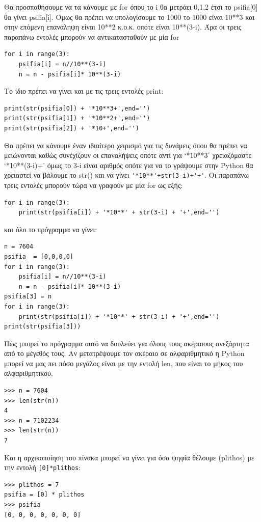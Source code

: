 \documentclass[b5paper,11pt,twoside,openleft]{memoir}
\begin{document}
Θα προσπαθήσουμε να τα κάνουμε με for όπου το i θα μετράει 0,1,2 έτσι το psifia[0] θα γίνει psifia[i]. Όμως θα πρέπει να υπολογίσουμε το 1000 το 1000 είναι 10**3 και στην επόμενη επανάληψη είναι 10**2 κ.ο.κ. οπότε είναι 10**(3-i).
Άρα οι τρεις παραπάνω εντολές μπορούν να αντικατασταθούν με μία for
\begin{lstlisting}
for i in range(3):
    psifia[i] = n//10**(3-i)
    n = n - psifia[i]* 10**(3-i)
\end{lstlisting}

Το ίδιο πρέπει να γίνει και με τις τρεις εντολές print:
\begin{lstlisting}
print(str(psifia[0]) + '*10**3+',end='')
print(str(psifia[1]) + '*10**2+',end='')
print(str(psifia[2]) + '*10+',end='')
\end{lstlisting}
Θα πρέπει να κάνουμε έναν ιδιαίτερο χειρισμό για τις δυνάμεις όπου θα πρέπει να μειώνονται καθώς συνέχίζουν οι επαναλήψεις οπότε αντί για `*10**3΄ χρειαζόμαστε `*10**(3-i)+' όμως το 3-i είναι αριθμός οπότε για να το γράψουμε στην Python θα χρειαστεί να βάλουμε το str() και να γίνει \lstinline{'*10**'+str(3-i)+'+'}. Οι παραπάνω τρεις εντολές μπορούν τώρα να γραφούν με μία for ως εξής:
\begin{lstlisting}
for i in range(3):
    print(str(psifia[i]) + '*10**' + str(3-i) + '+',end='')
\end{lstlisting}
και όλο το πρόγραμμα να γίνει:
\begin{lstlisting}
n = 7604
psifia  = [0,0,0,0]
for i in range(3):
    psifia[i] = n//10**(3-i)
    n = n - psifia[i]* 10**(3-i)
psifia[3] = n
for i in range(3):
    print(str(psifia[i]) + '*10**' + str(3-i) + '+',end='')
print(str(psifia[3]))
\end{lstlisting}

Πώς μπορεί το πρόγραμμα αυτό να δουλεύει για όλους τους ακέραιους ανεξάρτητα από το μέγεθός τους; Αν μετατρέψουμε τον ακέραιο σε αλφαριθμητικό η Python μπορεί να μας πει πόσο μεγάλος είναι με την εντολή len, που είναι το μήκος του αλφαριθμητικού.
\begin{lstlisting}
>>> n = 7604
>>> len(str(n))
4
>>> n = 7102234
>>> len(str(n))
7
\end{lstlisting}

Και η αρχικοποίηση του πίνακα μπορεί να γίνει για όσα ψηφία θέλουμε (plithos) με την εντολή \lstinline{[0]*plithos}:
\begin{lstlisting}
>>> plithos = 7
psifia = [0] * plithos
>>> psifia
[0, 0, 0, 0, 0, 0, 0]
\end{lstlisting}
\end{document}
